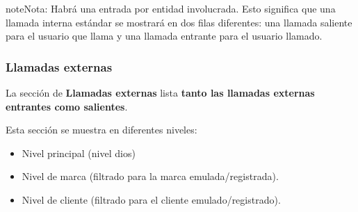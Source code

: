 \documentclass[letterpaper,10pt,spanish]{sphinxmanual}
\begin{document}
\begin{notice}{note}{Nota:}
Habrá una entrada por entidad involucrada. Esto significa que una llamada interna estándar se mostrará en dos filas diferentes: una llamada saliente para el usuario que llama y una llamada entrante para el usuario llamado.
\end{notice}


\subsubsection{Llamadas externas}
\label{administration_portal/client/wholesale/calls/external_calls::doc}\label{administration_portal/client/wholesale/calls/external_calls:external-calls}
La sección de \textbf{Llamadas externas} lista \textbf{tanto las llamadas externas entrantes como salientes}.

Esta sección se muestra en diferentes niveles:
\begin{itemize}
\item {} 
Nivel principal (nivel dios)

\item {} 
Nivel de marca (filtrado para la marca emulada/registrada).

\item {} 
Nivel de cliente (filtrado para el cliente emulado/registrado).

\end{itemize}
\end{document}
